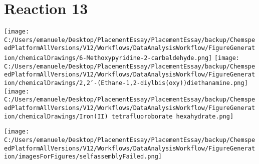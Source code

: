 \documentclass{article}%
\begin{document}
\section*{Reaction 13}%
%
\begin{scheme}[H]%
\begin{minipage}{0.5\textwidth}%
\texttt{[image: C:/Users/emanuele/Desktop/PlacementEssay/PlacementEssay/backup/ChemspeedPlatformAllVersions/V12/Workflows/DataAnalysisWorkflow/FigureGeneration/chemicalDrawings/6-Methoxypyridine-2-carbaldehyde.png]}%
\texttt{[image: C:/Users/emanuele/Desktop/PlacementEssay/PlacementEssay/backup/ChemspeedPlatformAllVersions/V12/Workflows/DataAnalysisWorkflow/FigureGeneration/chemicalDrawings/2,2'-(Ethane-1,2-diylbis(oxy))diethanamine.png]}%
\texttt{[image: C:/Users/emanuele/Desktop/PlacementEssay/PlacementEssay/backup/ChemspeedPlatformAllVersions/V12/Workflows/DataAnalysisWorkflow/FigureGeneration/chemicalDrawings/Iron(II) tetrafluoroborate hexahydrate.png]}%
\end{minipage}%
\begin{minipage}{0.5\textwidth}%
\begin{center}%
\texttt{[image: C:/Users/emanuele/Desktop/PlacementEssay/PlacementEssay/backup/ChemspeedPlatformAllVersions/V12/Workflows/DataAnalysisWorkflow/FigureGeneration/imagesForFigures/selfassemblyFailed.png]}%
\end{center}%
\end{minipage}%
\caption{Self-assembly of components 6, 19, with Iron(II) in a 3.0:1.5:1.0 molar ratio in CH$_3$CN at 60\textdegree C for 40h. These are the reagents (starting materials) for reaction 13.}%
\end{scheme}%
\end{document}
